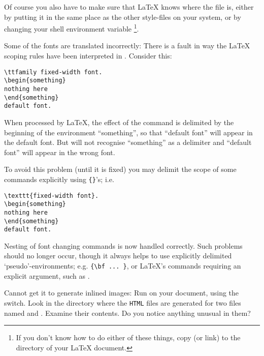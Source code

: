 \begin{htmllist}
Of course you also have to make sure that \LaTeX{} knows where the 
file is, either by putting it in the same place as the other style-files on
your system, or by changing your  shell environment variable
\footnote{If you don't know how to do either of these things, copy (or
link)  to the directory of your \LaTeX{} document.}.

\item [Some of the fonts are translated incorrectly: ]
There is a fault in way the \LaTeX{} scoping rules have been
interpreted in \latextohtml. Consider this:
\begin{small}
\begin{verbatim}
\ttfamily fixed-width font.
\begin{something}
nothing here
\end{something}
default font.
\end{verbatim}
\end{small}
When processed by \LaTeX, the effect of the  command is
delimited by the beginning of the environment ``something'',
so that ``default font'' will appear in the default font.
But \latextohtml{} will not recognise
``something'' as a delimiter and ``default font'' will appear in the
wrong font.

To avoid this problem (until it is fixed) you may delimit the scope of
some commands explicitly using \verb|{}|'s; i.e.
\begin{small}
\begin{verbatim}
\texttt{fixed-width font}.
\begin{something}
nothing here
\end{something}
default font.
\end{verbatim}
\end{small}

\begin{changebar}
Nesting of font changing commands is now handled correctly.
Such problems should no longer occur, though it always helps
to use explicitly delimited `pseudo'-environments; e.g.
\verb|{\bf ... }|, or \LaTeX's commands requiring an explicit argument,
such as .
\end{changebar}

\item [Cannot get it to generate inlined images: ]
Run \latextohtml{} on your document, using the  switch.
Look in the directory where the \texttt{HTML} files are generated
for two files named  and .
Examine their contents.
Do you notice anything unusual in them?


\end{htmllist}
